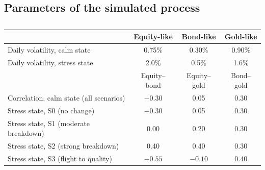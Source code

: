 \subsection{Parameters of the simulated process}

\begin{table}[h]
\centering{}\footnotesize
\caption{}\label{tab:dgp}
\begin{tabular}{lccc}
\toprule
 & Equity-like & Bond-like & Gold-like\\
\midrule
Daily volatility, calm state & 0.75\% & 0.30\% & 0.90\%\\
Daily volatility, stress state & 2.0\% & 0.5\% & 1.6\%\\
\midrule
 & Equity--bond & Equity--gold & Bond--gold\\
\midrule
Correlation, calm state (all scenarios) & $-0.30$ & 0.05 & 0.30\\
Stress state, S0 (no change) & $-0.30$ & 0.05 & 0.30\\
Stress state, S1 (moderate breakdown) & 0.00 & 0.20 & 0.30\\
Stress state, S2 (strong breakdown) & 0.40 & 0.40 & 0.30\\
Stress state, S3 (flight to quality) & $-0.55$ & $-0.10$ & 0.40\\
\bottomrule
\end{tabular}
\end{table}
